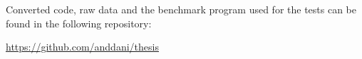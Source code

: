 
Converted code, raw data and the benchmark program used for the tests can be found in the following repository:

\begin{center}
    \url{https://github.com/anddani/thesis}
\end{center}



% 
%
% 
%
% 
%
% 
%
% 

